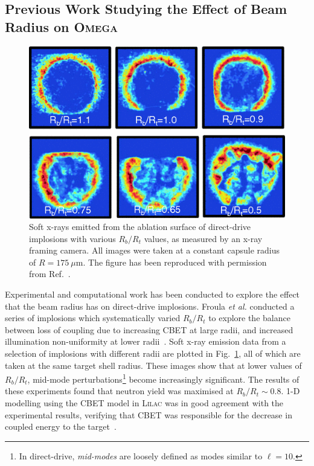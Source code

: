 \subsection{Previous Work Studying the Effect of Beam Radius on \textsc{Omega}}%
\label{sec:Res1_OMEGA_stat_modelling_RbRt}

\begin{figure}[t!]
    \includegraphics[width=0.5\linewidth]{Results1/Images/RbRt_froula.png}
    \centering
    \caption{Soft x-rays emitted from the ablation surface of direct-drive implosions with various $R_b/R_t$ values, as measured by an x-ray framing camera.
    All images were taken at a constant capsule radius of $R=175\ \mu\text{m}$.
    The figure has been reproduced with permission from Ref.~\cite{froula_increasing_2012}.}%
    \label{fig:RbRt_froula}
\end{figure}

Experimental and computational work has been conducted to explore the effect that the beam radius has on direct-drive implosions.
Froula \textit{et al.} conducted a series of implosions which systematically varied $R_b/R_t$ to explore the balance between loss of coupling due to increasing \ac{CBET} at large radii, and increased illumination non-uniformity at lower radii~\cite{froula_increasing_2012}.
Soft x-ray emission data from a selection of implosions with different radii are plotted in Fig.~\ref{fig:RbRt_froula}, all of which are taken at the same target shell radius.
These images show that at lower values of $R_b/R_t$, mid-mode perturbations\footnote{In direct-drive, \textit{mid-modes} are loosely defined as modes similar to $\ell=10$.} become increasingly significant.
The results of these experiments found that neutron yield was maximised at $R_b/R_t\sim 0.8$.
1-D modelling using the \ac{CBET} model in \textsc{Lilac} was in good agreement with the experimental results, verifying that \ac{CBET} was responsible for the decrease in coupled energy to the target~\cite{igumenshchev_crossed-beam_2012}.

